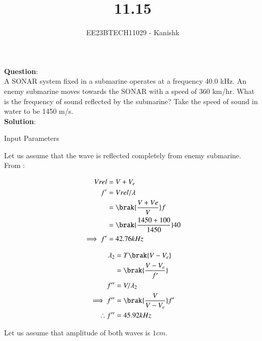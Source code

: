 \documentclass[journal,12pt,onecolumn]{IEEEtran}
\theoremstyle{remark}
\begin{document}

\vspace{3cm}

\title{11.15}
\author{EE23BTECH11029 - Kanishk}
\maketitle

\bigskip

\renewcommand{\thefigure}{\theenumi}
\renewcommand{\thetable}{\theenumi}
\footnotesize
\textbf{Question}:\\ 

A SONAR system fixed in a submarine operates at a frequency 40.0 kHz. An enemy submarine moves towards the SONAR with a speed of 360 km/hr. What is the frequency of sound reflected by the submarine? Take the speed of sound in water to be 1450 m/s.\\

\textbf{Solution}:\\

\begin{table}[ht]
    \centering
    \def\arraystretch{1.5}
    
   \caption{Input Parameters}
   \label{tab:11.15.25}
\end{table}

Let us assume that the wave is reflected completely from enemy submarine.\\


From  :

\begin{align}
Vrel&=V+V_e\\
f'&=Vrel/\lambda\\
&=\brak{\frac{V+Ve}{V}}f\\
&= \brak{\frac{1450+100}{1450}}40\\
\implies f' &=42.76kHz
\end{align}

\begin{align}
\lambda_2&=T\brak{V-V_e}\\
&=\brak{\frac{V-V_e}{f'}}\\
f''&=V/\lambda_2\\
\implies f'' &=\brak{\frac{V}{V-V_e}}f'\\
\therefore f''&=45.92kHz
\end{align}







\newpage
Let us assume that amplitude of both waves is $1cm$.
\end{document}
